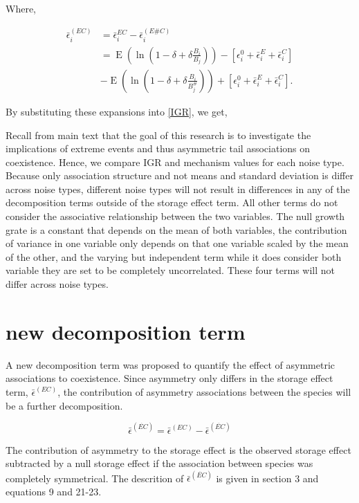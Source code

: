 \documentclass[letterpaper,11pt]{article}
\DeclareMathOperator{\EX}{E}%
\begin{document}
\noindent Where,

\begin{align}
\bar \epsilon_i^{(EC)}&=\bar \epsilon_i^{EC}-\bar \epsilon_i^{(E\#C)}\\
&= \EX(\ln(1-\delta + \delta \frac{B_i}{B_j}))-[\epsilon_i^0 +\bar \epsilon_i^E + \bar \epsilon_i^C]\\
&- \EX(\ln(1-\delta + \delta \frac{B_i}{B_j^{\#}})) +[\epsilon_i^0 +\bar \epsilon_i^E + \bar \epsilon_i^C].
\end{align}

By substituting these expansions into \ref{IGR}, we get, 

Recall from main text that the goal of this research is to investigate the implications of extreme events and thus asymmetric tail associations on coexistence. Hence, we compare IGR and mechanism values for each noise type. Because only association structure and not means and standard deviation is differ across noise types, different noise types will not result in differences in any of the decomposition terms outside of the storage effect term. All other terms do not consider the associative relationship between the two variables. The null growth grate is a constant that depends on the mean of both variables, the contribution of variance in one variable only depends on that one variable scaled by the mean of the other, and the varying but independent term while it does consider both variable they are set to be completely uncorrelated. These four terms will not differ across noise types. 

\section{new decomposition term}

A new decomposition term was proposed to quantify the effect of asymmetric associations to coexistence. Since asymmetry only differs in the storage effect term, $\bar \epsilon^{(EC)}$, the contribution of asymmetry associations between the species will be a further decomposition. 

\begin{equation}
\bar \epsilon^{(\dot {EC})} = \bar \epsilon^{(EC)} - \bar \epsilon^{(\ddot {EC})}
\end{equation}

The contribution of asymmetry to the storage effect is the observed storage effect subtracted by a null storage effect if the association between species was completely symmetrical. 
The descrition of $\bar \epsilon^{(\ddot {EC})}$ is given in section 3 and equations 9 and 21-23. 
\end{document}
